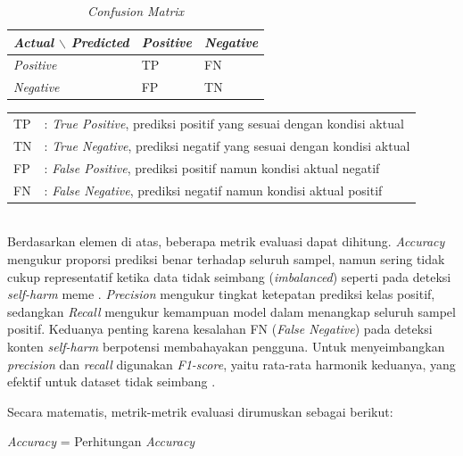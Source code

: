 \begin{table}[H]
	\centering
	\caption{\textit{Confusion Matrix}}
	\label{table:confmatrix}
	\small
	\setlength{\tabcolsep}{4pt}
	\renewcommand{\arraystretch}{1.2}
	\begin{tabular}{>{\centering\arraybackslash}m{2.6cm} >{\centering\arraybackslash}m{1.5cm} >{\centering\arraybackslash}m{1.5cm}}
		\hline
		\textbf{\textit{Actual $\backslash$ Predicted}} & \textbf{\textit{Positive}} & \textbf{\textit{Negative}} \\
		\hline
		\textit{Positive} & TP & FN \\
		\textit{Negative} & FP & TN \\
		\hline
	\end{tabular}
\end{table}

\noindent
{}

\begin{tabular}{l l}
TP & : \textit{True Positive}, prediksi positif yang sesuai dengan kondisi aktual \\ 
TN & : \textit{True Negative}, prediksi negatif yang sesuai dengan kondisi aktual \\ 
FP & : \textit{False Positive}, prediksi positif namun kondisi aktual negatif \\ 
FN & : \textit{False Negative}, prediksi negatif namun kondisi aktual positif \\ 
\end{tabular} \\

Berdasarkan elemen di atas, beberapa metrik evaluasi dapat dihitung. 
\textit{Accuracy} mengukur proporsi prediksi benar terhadap seluruh sampel, 
namun sering tidak cukup representatif ketika data tidak seimbang 
(\textit{imbalanced}) seperti pada deteksi \textit{self-harm} meme \cite{sokolova2009systematic}. \textit{Precision} mengukur tingkat ketepatan prediksi kelas positif, sedangkan 
\textit{Recall} mengukur kemampuan model dalam menangkap seluruh sampel positif. 
Keduanya penting karena kesalahan FN (\textit{False Negative}) pada deteksi 
konten \textit{self-harm} berpotensi membahayakan pengguna. 
Untuk menyeimbangkan \textit{precision} dan \textit{recall} digunakan \textit{F1-score}, yaitu 
rata-rata harmonik keduanya, yang efektif untuk dataset tidak seimbang 
\cite{powers2020evaluationprecisionrecallfmeasure}.

Secara matematis, metrik-metrik evaluasi dirumuskan sebagai berikut:

\begin{equationcaptioned}[eq:accuracy]{
\textit{Accuracy} = 
}{
Perhitungan \textit{Accuracy}
}
\end{equationcaptioned}

